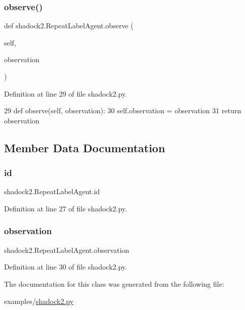 \subsubsection{\texorpdfstring{observe()}{observe()}}
{\footnotesize\ttfamily def shadock2.\+Repeat\+Label\+Agent.\+observe (\begin{DoxyParamCaption}\item[{}]{self,  }\item[{}]{observation }\end{DoxyParamCaption})}



Definition at line 29 of file shadock2.\+py.


\begin{DoxyCode}
29     \textcolor{keyword}{def }observe(self, observation):
30         self.observation = observation
31         \textcolor{keywordflow}{return} observation
\end{DoxyCode}


\subsection{Member Data Documentation}
\mbox{\label{classshadock2_1_1RepeatLabelAgent_a2f86c98e40c0ed00dce454230f6ea1b7}} 
\subsubsection{\texorpdfstring{id}{id}}
{\footnotesize\ttfamily shadock2.\+Repeat\+Label\+Agent.\+id}



Definition at line 27 of file shadock2.\+py.

\mbox{\label{classshadock2_1_1RepeatLabelAgent_af88efda5c17ebe03c85cc4b3446c1072}} 
\subsubsection{\texorpdfstring{observation}{observation}}
{\footnotesize\ttfamily shadock2.\+Repeat\+Label\+Agent.\+observation}



Definition at line 30 of file shadock2.\+py.



The documentation for this class was generated from the following file\+:\begin{DoxyCompactItemize}
\item 
examples/\hyperlink{shadock2_8py}{shadock2.\+py}\end{DoxyCompactItemize}
